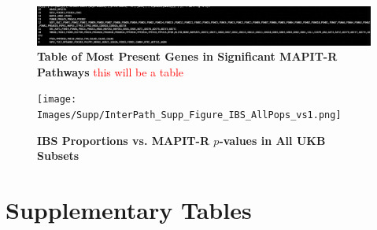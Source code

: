 \documentclass[12pt, a4paper]{article}
\begin{document}

\begin{landscape}
\begin{figure}[htbp]
\centering
\hspace*{-2.5cm}
\includegraphics[scale=1]{Images/Supp/InterPath_Supp_Table_TopPathwayGeneCounts.png}
\caption[TBD]{\textbf{Table of Most Present Genes in Significant MAPIT-R Pathways} \textcolor{red}{this will be a table}}
\label{InterPath-Supp-Tables-GeneCounts}
\end{figure}
\end{landscape}
\clearpage

\begin{figure}[htbp]
\centering
\texttt{[image: Images/Supp/InterPath\_Supp\_Figure\_IBS\_AllPops\_vs1.png]}
\caption[TBD]{\textbf{IBS Proportions vs. MAPIT-R $p$-values in All UKB Subsets}}
\label{InterPath-Supp-Figure-IBS-AllPops}
\end{figure}
\clearpage

\section{Supplementary Tables}\label{Supplementary-Tables}
\end{document}
